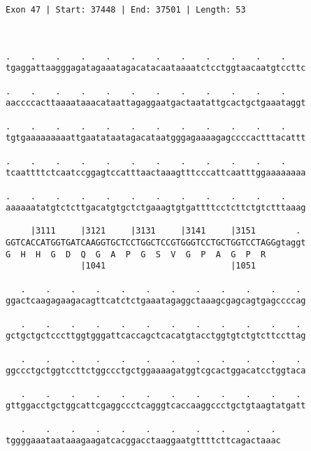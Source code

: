 \documentclass{article}
\begin{document}
\begin{Verbatim}
Exon 47 | Start: 37448 | End: 37501 | Length: 53



.    .    .    .    .    .    .    .    .    .    .    .    
tgaggattaagggagatagaaatagacatacaataaaatctcctggtaacaatgtccttc
                                                            
.    .    .    .    .    .    .    .    .    .    .    .    
aaccccacttaaaataaacataattagaggaatgactaatattgcactgctgaaataggt
                                                            
.    .    .    .    .    .    .    .    .    .    .    .    
tgtgaaaaaaaaattgaatataatagacataatgggagaaaagagccccactttacattt
                                                            
.    .    .    .    .    .    .    .    .    .    .    .    
tcaattttctcaatccggagtccatttaactaaagtttcccattcaatttggaaaaaaaa
                                                            
.    .    .    .    .    .    .    .    .    .    .    .    
aaaaaatatgtctcttgacatgtgctctgaaagtgtgattttcctcttctgtctttaaag
                                                            
     |3111     |3121     |3131     |3141     |3151        . 
GGTCACCATGGTGATCAAGGTGCTCCTGGCTCCGTGGGTCCTGCTGGTCCTAGGgtaggt
G  H  H  G  D  Q  G  A  P  G  S  V  G  P  A  G  P  R        
               |1041                         |1051          
  
   .    .    .    .    .    .    .    .    .    .    .    . 
ggactcaagagaagacagttcatctctgaaatagaggctaaagcgagcagtgagccccag
                                                            
   .    .    .    .    .    .    .    .    .    .    .    . 
gctgctgctcccttggtgggattcaccagctcacatgtacctggtgtctgtcttccttag
                                                            
   .    .    .    .    .    .    .    .    .    .    .    . 
ggccctgctggtccttctggccctgctggaaaagatggtcgcactggacatcctggtaca
                                                            
   .    .    .    .    .    .    .    .    .    .    .    . 
gttggacctgctggcattcgaggccctcagggtcaccaaggccctgctgtaagtatgatt
                                                            
   .    .    .    .    .    .    .    .    .    .    . 
tggggaaataataaagaagatcacggacctaaggaatgttttcttcagactaaac
                                                       

\end{Verbatim}
\end{document}
